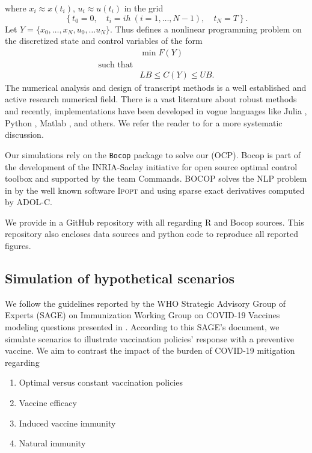     where $x_i \approx x(t_i)$,
    $u_i \approx u(t_i)$ in the grid
    $$
        \left\{
            t_0 = 0,\quad
            t_i = i h \ (i=1,\dots, N-1),\quad
            t_N = T
        \right\}.
    $$
    Let $Y = \{x_0, \dots, x_N, u_0,\dots u_N\}$.
    Thus  defines a nonlinear programming problem on the
    discretized state and control variables of the form
    \begin{equation}
        \label{eqn:nlp_form}
        \begin{aligned}
            &
            \min F(Y)
        \\
        \text{such that} &
        \\
            &
            LB \leq C(Y) \leq UB .
        \end{aligned}
    \end{equation}
        The numerical analysis and design of transcript methods is a well
    established  and active research numerical field. There is a vast
    literature about robust methods and recently, implementations have been
    developed in vogue languages like Julia
    \cite{DunningHuchetteLubin2017, LubinDunningIJOC}, Python \cite{libcmaes},
    Matlab \cite{matlabOpt}, and others. We refer the reader to
    \cite{Betts2001,Seywald1993} for a more systematic discussion.

        Our simulations rely on the \verb|Bocop| package
    \cite{Bocop,BocopExamples} to solve our (OCP). Bocop is part of the
    development of the INRIA-Saclay initiative for open source optimal control
    toolbox and supported by the team Commands. BOCOP solves the NLP problem in
     by the well known software \textsc{Ipopt} and using
    sparse exact derivatives computed by ADOL-C.

        We provide in \cite{gitHub} a GitHub repository with all regarding R
    and Bocop sources. This repository also encloses data sources and python
    code to reproduce all reported figures.

\subsection{Simulation of hypothetical scenarios}
        We follow the guidelines reported by the WHO Strategic Advisory Group
    of Experts (SAGE) on Immunization Working Group on COVID-19 Vaccines
    modeling questions presented in \cite{sage2020}. According to this SAGE's
    document, we simulate scenarios to illustrate vaccination policies'
    response with a preventive vaccine. We aim to contrast the impact of the
    burden of COVID-19 mitigation regarding
    \begin{enumerate}
        \item Optimal versus constant vaccination policies
        \item Vaccine efficacy
        \item Induced vaccine immunity
        \item Natural immunity
    \end{enumerate}

